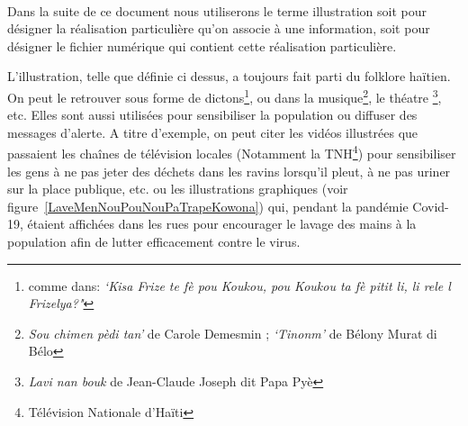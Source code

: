	\paragraph{} Dans la suite de ce document nous utiliserons le terme illustration soit pour d\'esigner la r\'ealisation particuli\`ere qu'on associe \`a une information, soit pour d\'esigner le fichier num\'erique qui contient cette r\'ealisation particuli\`ere.\par

\noindent L'illustration, telle que d\'efinie ci dessus,  a toujours fait parti du folklore ha\"itien. On peut le retrouver sous forme de dictons\footnote{comme dans: \emph{\lq Kisa Frize te f\`e pou Koukou, pou Koukou ta f\`e pitit li, li rele l Frizelya?"}}, ou dans la musique\footnote{\textit{Sou chimen p\`edi tan\rq} de Carole Demesmin ; \textit{\lq Tinonm\rq} de B\'elony Murat di B\'elo}, le th\'eatre \footnote{\textit{Lavi nan bouk} de Jean-Claude Joseph dit Papa Py\`e}, etc. Elles sont aussi utilis\'ees pour sensibiliser la population ou diffuser des messages d'alerte. A titre d'exemple, on peut citer les vid\'eos illustr\'ees que passaient les cha\^ines de t\'el\'evision locales (Notamment la TNH\footnote{T\'el\'evision Nationale d'Ha\"iti}) pour sensibiliser les gens \`a ne pas jeter des d\'echets dans les ravins lorsqu'il pleut\cite{TiJowelOuJetreFatraADeja}, \`a ne pas uriner sur la place publique\cite{DegajePaPeche}, etc. ou les illustrations graphiques (voir figure~\ref{LaveMenNouPouNouPaTrapeKowona}) qui, pendant la pand\'emie Covid-19,  \'etaient affich\'ees dans les rues pour encourager le lavage des mains \`a la population afin de lutter efficacement contre le virus.


